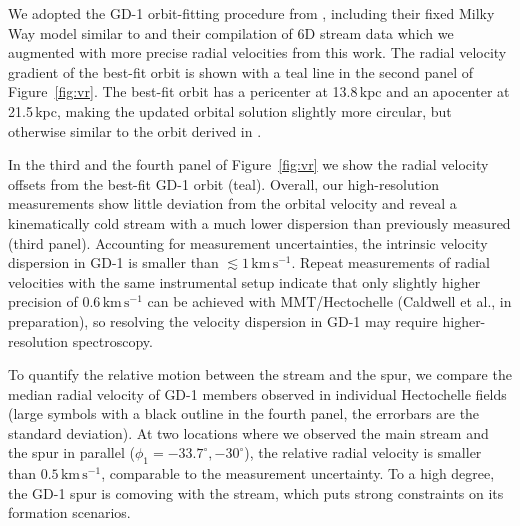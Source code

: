 \documentclass[twocolumn]{aastex63}
\newcommand{\kms}{\ensuremath{\textrm{km}\,\textrm{s}^{-1}}}
\begin{document}
We adopted the GD-1 orbit-fitting procedure from \citet{pwb}, including their fixed Milky Way model similar to \citet{bovy2015} and their compilation of 6D stream data which we augmented with more precise radial velocities from this work.
The radial velocity gradient of the best-fit orbit is shown with a teal line in the second panel of Figure~\ref{fig:vr}.
The best-fit orbit has a pericenter at 13.8\,kpc and an apocenter at 21.5\,kpc, making the updated orbital solution slightly more circular, but otherwise similar to the orbit derived in \citet{pwb}.

In the third and the fourth panel of Figure~\ref{fig:vr} we show the radial velocity offsets from the best-fit GD-1 orbit (teal).
Overall, our high-resolution measurements show little deviation from the orbital velocity and reveal a kinematically cold stream with a much lower dispersion than previously measured (third panel).
Accounting for measurement uncertainties, the intrinsic velocity dispersion in GD-1 is smaller than $\lesssim1\,\kms$.
Repeat measurements of radial velocities with the same instrumental setup indicate that only slightly higher precision of $0.6\,\kms$ can be achieved with MMT/Hectochelle (Caldwell et al., in preparation), so resolving the velocity dispersion in GD-1 may require higher-resolution spectroscopy.


To quantify the relative motion between the stream and the spur, we compare the median radial velocity of GD-1 members observed in individual Hectochelle fields (large symbols with a black outline in the fourth panel, the errorbars are the standard deviation).
At two locations where we observed the main stream and the spur in parallel ($\phi_1=-33.7^\circ, -30^\circ$), the relative radial velocity is smaller than $0.5\,\kms$, comparable to the measurement uncertainty.
To a high degree, the GD-1 spur is comoving with the stream, which puts strong constraints on its formation scenarios.
\end{document}

